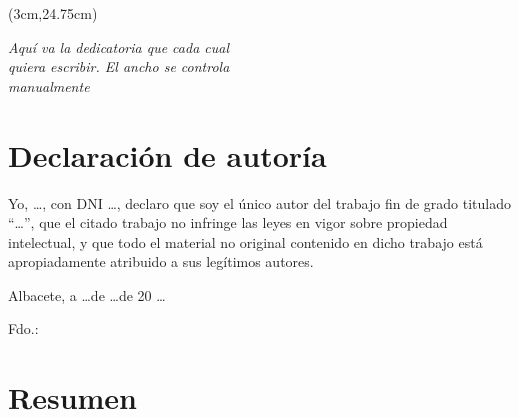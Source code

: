 \begin{textblock*}{\textwidth}(3cm,24.75cm) 
\begin{flushright}
{\fontsize{14pt}{4pt}\selectfont \fecha}
\end{flushright}
\end{textblock*}


\cleardoublepage
\thispagestyle{empty}

\vspace*{9cm}  
\begin{flushright} \em 
Aquí va la dedicatoria que cada cual \\ 
quiera escribir. El ancho se controla \\ 
manualmente
\end{flushright}


\cleardoublepage
\thispagestyle{plain}
\chapter*{Declaración de autoría}


Yo, \quad \ldots \quad, con DNI \quad \ldots \quad, declaro que soy el único autor del trabajo fin de grado titulado ``\quad \ldots \quad'', que el citado trabajo no infringe las leyes en vigor sobre propiedad intelectual, y que todo el material no original contenido en dicho trabajo está apropiadamente atribuido a sus legítimos autores.

\vspace*{2cm}
\begin{center}
Albacete, a \quad \ldots \quad de \quad \ldots \quad de 20 \ldots

\vskip3cm

Fdo.: \autor
\end{center}


\cleardoublepage
\thispagestyle{plain}
\chapter*{Resumen}

\lipsum[1]

\cleardoublepage
\thispagestyle{plain}
\vspace*{4cm}
\begin{center}
\Large{}
\end{center}
\vskip0.5cm

\lipsum[1]